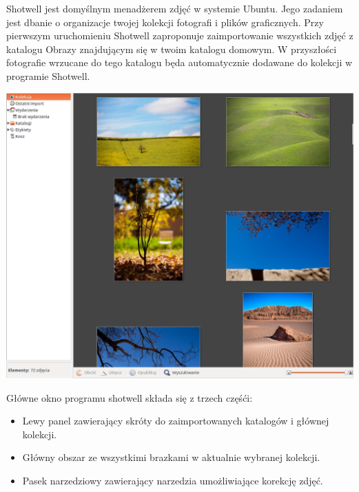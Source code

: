 Shotwell jest domyślnym menadżerem zdjęć w systemie Ubuntu. Jego zadaniem jest dbanie o organizacje twojej kolekcji fotografi i plików graficznych. Przy pierwszym uruchomieniu Shotwell zaproponuje zaimportowanie wszystkich zdjęć z katalogu Obrazy znajdującym się w twoim katalogu domowym. W przyszłości fotografie wrzucane do tego katalogu będa automatycznie dodawane do kolekcji w programie Shotwell.
\begin{center}
	\includegraphics[width=\linewidth]{images/programy_shotwell1.png}
\end{center}

Główne okno programu shotwell składa się z trzech częśći:
\begin{itemize}
\item \textcolor{ubuntu_orange}{Lewy panel} zawierający skróty do zaimportowanych katalogów i głównej kolekcji.
\item \textcolor{ubuntu_orange}{Główny obszar} ze wszystkimi brazkami w aktualnie wybranej kolekcji.
\item \textcolor{ubuntu_orange}{Pasek narzedziowy} zawierający narzedzia umożliwiające korekcję zdjęć.
\end{itemize}
